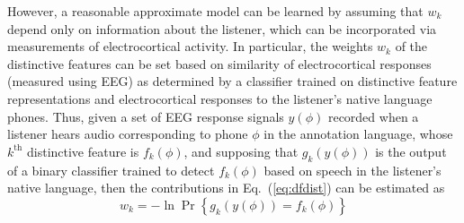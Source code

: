 However, a reasonable approximate model can be learned by assuming
that $w_k$ depend only on information about the listener, which can be
incorporated via measurements of electrocortical activity. In
particular, the weights $w_k$ of the distinctive features can be set
based on similarity of electrocortical responses (measured using EEG)
as determined by a classifier trained on distinctive feature
representations and electrocortical responses to the listener's native
language phones. Thus, given a set of EEG response signals $y(\phi)$
recorded when a listener hears audio corresponding to phone $\phi$ in
the annotation language, whose $k^\textrm{th}$ distinctive feature is
$f_k(\phi)$, and supposing that $g_k(y(\phi))$ is the output of a
binary classifier trained to detect $f_k(\phi)$ based on speech in the
listener's native language\cite{Liberto15}, then the contributions in
Eq.~(\ref{eq:dfdist}) can be estimated as
\begin{equation}
  w_k = -\ln\Pr\left\{g_k(y(\phi))= f_k(\phi)\right\}
  \label{eq:eegdist}
\end{equation}
